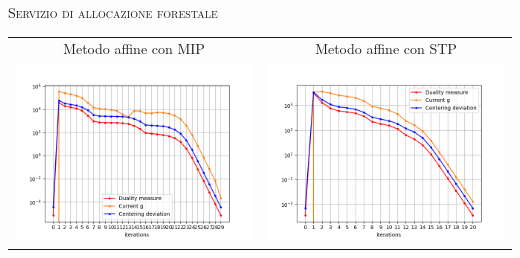 \begin{frame}{\textsc{\LARGE \textcolor{iris}{Servizio di allocazione forestale}}}
\centering
\begin{tabular}{c@{}c}
\small{Metodo affine con MIP} & \small{Metodo affine con STP} \\
	\includegraphics[scale = 0.33]{for_aff1}
	&\includegraphics[scale = 0.33]{for_aff3}\\ 
\end{tabular}
\end{frame}

